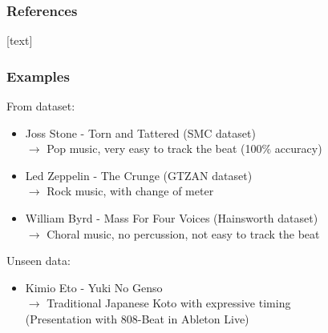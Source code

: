 \documentclass{beamer}
\newcommand{\backupbegin}{
   \newcounter{finalframe}
   \setcounter{finalframe}{\value{framenumber}}
}
\begin{document}
\appendix
\backupbegin

\begin{frame} %
\frametitle{References}

[text]
% 

\tiny

\end{frame}

\begin{frame}
\frametitle{Examples}
From dataset:
\begin{itemize}
\item Joss Stone - Torn and Tattered (SMC dataset)  \\ 
$\rightarrow$ Pop music, very easy to track the beat (100$\%$ accuracy)
\item Led Zeppelin - The Crunge (GTZAN dataset) \\ 
$\rightarrow$ Rock music, with change of meter
\item William Byrd - Mass For Four Voices (Hainsworth dataset) \\ 
$\rightarrow$ Choral music, no percussion, not easy to track the beat
\end{itemize}
Unseen data:
\begin{itemize}
\item Kimio Eto - Yuki No Genso  \\ 
$\rightarrow$ Traditional Japanese Koto with expressive timing \\\vspace{0.5em}
(Presentation with 808-Beat in Ableton Live)
\end{itemize}

\end{frame}





\end{document}
